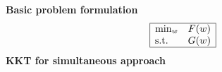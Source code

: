
\begin{tcolorbox}[colback=lime!5!white,%
  colframe=lime!75!black,%
  title=\textbf{Sequential and Simultaneous approach}]
  \textbf{Basic problem formulation}
  \begin{align*}
    \begin{array}{|rl|}\hline
    \min_w &F(w) \\
    \mathrm{s.t.}\quad & G(w) \\ \hline
    \end{array}

  \end{align*}
  \textbf{KKT for simultaneous approach}
\end{tcolorbox}
